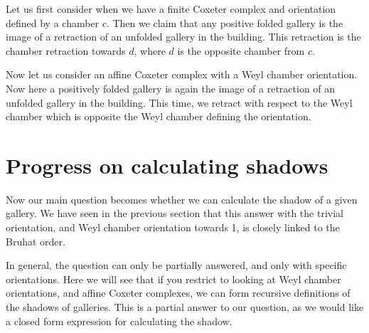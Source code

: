 \documentclass[11pt]{article}
\begin{document}



    



Let us first consider when we have a finite Coxeter complex and orientation defined by a chamber $c$. Then we claim that any positive folded gallery is the image of a retraction of an unfolded gallery in the building. This retraction is the chamber retraction towards $d$, where $d$ is the opposite chamber from $c$. 


Now let us consider an affine Coxeter complex with a Weyl chamber orientation. Now here a positively folded gallery is again the image of a retraction of an unfolded gallery in the building. This time, we retract with respect to the Weyl chamber which is opposite the Weyl chamber defining the orientation.






\section{Progress on calculating shadows}\label{9}

Now our main question becomes whether we can calculate the shadow of a given gallery. We have seen in the previous section that this answer with the trivial orientation, and Weyl chamber orientation towards 1, is closely linked to the Bruhat order. 

In general, the question can only be partially answered, and only with specific orientations. Here we will see that if you restrict to looking at Weyl chamber orientations, and affine Coxeter complexes, we can form recursive definitions of the shadows of galleries. This is a partial answer to our question, as we would like a closed form expression for calculating the shadow. 
\end{document}
